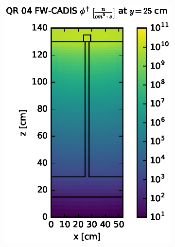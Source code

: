 \begin{figure}[!htb]
\centering
\begin{subfigure}{0.4\textwidth}
\includegraphics[max height=0.445\textheight]
{img/steel-plots/fwc-adj/flux-qr04-slice.eps}
\end{subfigure} ~
\begin{subfigure}{0.4\textwidth}

\end{subfigure}
\end{figure}
